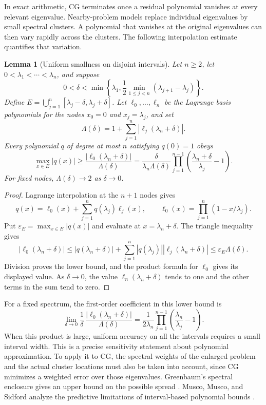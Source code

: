\documentclass[11pt]{article}
\newtheorem{lemma}{Lemma}
\theoremstyle{definition}
\begin{document}
In exact arithmetic, CG terminates once a residual polynomial vanishes
at every relevant eigenvalue.  Nearby-problem models replace individual
eigenvalues by small spectral clusters.  A polynomial that vanishes at
the original eigenvalues can then vary rapidly across the clusters.
The following interpolation estimate quantifies that variation.

\begin{lemma}[Uniform smallness on disjoint intervals]
\label{lem:intervals}
Let $n\ge2$, let $0<\lambda_1<\cdots<\lambda_n$, and suppose
\[
 0<\delta<\min\left\{\lambda_1,\frac12
                   \min_{1\le j<n}(\lambda_{j+1}-\lambda_j)\right\}.
\]
Define $E=\bigcup_{j=1}^n[\lambda_j-\delta,\lambda_j+\delta]$.
Let $\ell_0,\ldots,\ell_n$ be the Lagrange basis polynomials for the
nodes $x_0=0$ and $x_j=\lambda_j$, and set
\[
 \Lambda(\delta)=1+\sum_{j=1}^n|\ell_j(\lambda_n+\delta)|.
\]
Every polynomial $q$ of degree at most $n$ satisfying $q(0)=1$ obeys
\begin{equation}
 \max_{x\in E}|q(x)|
 \ge\frac{|\ell_0(\lambda_n+\delta)|}{\Lambda(\delta)}
 =\frac{\delta}{\lambda_n\Lambda(\delta)}
   \prod_{j=1}^{n-1}\left(\frac{\lambda_n+\delta}{\lambda_j}-1\right).
 \label{eq:interval-lower-bound}
\end{equation}
For fixed nodes, $\Lambda(\delta)\to2$ as $\delta\to0$.
\end{lemma}

\begin{proof}
Lagrange interpolation at the $n+1$ nodes gives
\[
 q(x)=\ell_0(x)+\sum_{j=1}^nq(\lambda_j)\ell_j(x),
 \qquad \ell_0(x)=\prod_{j=1}^n(1-x/\lambda_j).
\]
Put $\varepsilon_E=\max_{x\in E}|q(x)|$ and evaluate at
$x=\lambda_n+\delta$.  The triangle inequality gives
\[
 |\ell_0(\lambda_n+\delta)|
 \le |q(\lambda_n+\delta)|
      +\sum_{j=1}^n|q(\lambda_j)||\ell_j(\lambda_n+\delta)|
 \le\varepsilon_E\Lambda(\delta).
\]
Division proves the lower bound, and the product formula for $\ell_0$
gives its displayed value.  As $\delta\to0$, the value
$\ell_n(\lambda_n+\delta)$ tends to one and the other terms in the sum
tend to zero.
\end{proof}

For a fixed spectrum, the first-order coefficient in this lower bound
is
\[
 \lim_{\delta\to0}
 \frac{1}{\delta}\,
 \frac{|\ell_0(\lambda_n+\delta)|}{\Lambda(\delta)}
 =\frac{1}{2\lambda_n}
   \prod_{j=1}^{n-1}\left(\frac{\lambda_n}{\lambda_j}-1\right).
\]
When this product is large, uniform accuracy on all the intervals
requires a small interval width.  This is a precise sensitivity
statement about polynomial approximation.  To apply it to CG, the
spectral weights of the enlarged problem and the actual cluster
locations must also be taken into account, since CG minimizes a weighted
error over those eigenvalues.  Greenbaum's spectral enclosure gives
an upper bound on the possible spread \cite{Greenbaum1989}.
Musco, Musco, and Sidford analyze the predictive limitations of
interval-based polynomial bounds \cite{MuscoMuscoSidford2018}.
\end{document}
